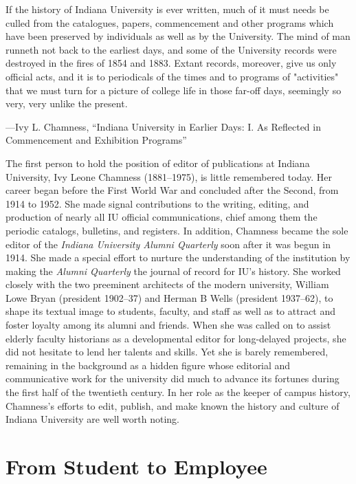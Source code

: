 \documentclass[
  american,
  letterpaper,
]{scrreprt}
\begin{document}
\epigraph{
If the history of Indiana University is ever written, much of it must needs be culled from the catalogues, papers, commencement and other programs which have been preserved by individuals as well as by the University. The mind of man runneth not back to the earliest days, and some of the University records were destroyed in the fires of 1854 and 1883. Extant records, moreover, give us only official acts, and it is to periodicals of the times and to programs of "activities" that we must turn for a picture of college life in those far-off days, seemingly so very, very unlike the present.  }
{---Ivy L. Chamness, “Indiana University in Earlier Days: I. As Reflected in Commencement and Exhibition Programs”}

The first person to hold the position of editor of publications at
Indiana University, Ivy Leone Chamness (1881--1975), is little
remembered today. Her career began before the First World War and
concluded after the Second, from 1914 to 1952. She made signal
contributions to the writing, editing, and production of nearly all IU
official communications, chief among them the periodic catalogs,
bulletins, and registers. In addition, Chamness became the sole editor
of the \emph{Indiana University Alumni Quarterly} soon after it was
begun in 1914. She made a special effort to nurture the understanding of
the institution by making the \emph{Alumni Quarterly} the journal of
record for IU's history. She worked closely with the two preeminent
architects of the modern university, William Lowe Bryan (president
1902--37) and Herman B Wells (president 1937--62), to shape its textual
image to students, faculty, and staff as well as to attract and foster
loyalty among its alumni and friends. When she was called on to assist
elderly faculty historians as a developmental editor for long-delayed
projects, she did not hesitate to lend her talents and skills. Yet she
is barely remembered, remaining in the background as a hidden figure
whose editorial and communicative work for the university did much to
advance its fortunes during the first half of the twentieth century. In
her role as the keeper of campus history, Chamness's efforts to edit,
publish, and make known the history and culture of Indiana University
are well worth noting.

\section{From Student to Employee}\label{from-student-to-employee}
\end{document}
